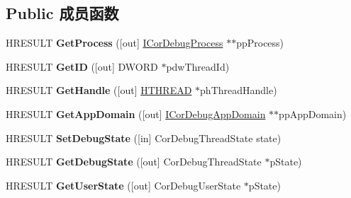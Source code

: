 \subsection*{Public 成员函数}
\begin{DoxyCompactItemize}
\item 
\mbox{\label{interface_i_cor_debug_thread_a1a2cc1ca65fb822e47b6492317cc5d81}} 
H\+R\+E\+S\+U\+LT {\bfseries Get\+Process} (\mbox{[}out\mbox{]} \hyperlink{interface_i_cor_debug_process}{I\+Cor\+Debug\+Process} $\ast$$\ast$pp\+Process)
\item 
\mbox{\label{interface_i_cor_debug_thread_a7536ed741876a5151bc4955769474694}} 
H\+R\+E\+S\+U\+LT {\bfseries Get\+ID} (\mbox{[}out\mbox{]} D\+W\+O\+RD $\ast$pdw\+Thread\+Id)
\item 
\mbox{\label{interface_i_cor_debug_thread_aa931f0d350486b6713a9cdef52620c46}} 
H\+R\+E\+S\+U\+LT {\bfseries Get\+Handle} (\mbox{[}out\mbox{]} \hyperlink{interfacevoid}{H\+T\+H\+R\+E\+AD} $\ast$ph\+Thread\+Handle)
\item 
\mbox{\label{interface_i_cor_debug_thread_a7f14f95eb4a111b8fb1525c76e208fa2}} 
H\+R\+E\+S\+U\+LT {\bfseries Get\+App\+Domain} (\mbox{[}out\mbox{]} \hyperlink{interface_i_cor_debug_app_domain}{I\+Cor\+Debug\+App\+Domain} $\ast$$\ast$pp\+App\+Domain)
\item 
\mbox{\label{interface_i_cor_debug_thread_ab9a01c70f686a0f6390f6d36ae1abd47}} 
H\+R\+E\+S\+U\+LT {\bfseries Set\+Debug\+State} (\mbox{[}in\mbox{]} Cor\+Debug\+Thread\+State state)
\item 
\mbox{\label{interface_i_cor_debug_thread_ac7e9fb8eb133fd9db3269d494a1ef25b}} 
H\+R\+E\+S\+U\+LT {\bfseries Get\+Debug\+State} (\mbox{[}out\mbox{]} Cor\+Debug\+Thread\+State $\ast$p\+State)
\item 
\mbox{\label{interface_i_cor_debug_thread_a840627e5d1947eb425dc32759f1d0dc0}} 
H\+R\+E\+S\+U\+LT {\bfseries Get\+User\+State} (\mbox{[}out\mbox{]} Cor\+Debug\+User\+State $\ast$p\+State)
\item 
\mbox{\label{interface_i_cor_debug_thread_ac0a9ddeeb7f8500b2f5c52f15227d387}} 

\end{DoxyCompactItemize}
